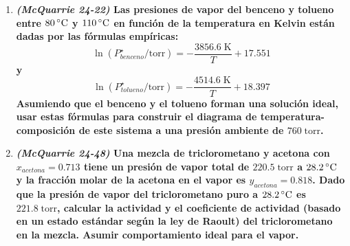 \documentclass[a4paper,12pt]{article}
\begin{document}
\begin{enumerate}
 \item \textbf{\textit{(McQuarrie 24-22)} Las presiones de vapor del benceno y tolueno entre $80\,\celsius$ y $110\,\celsius$ en funci\'on de la temperatura en Kelvin est\'an dadas por las f\'ormulas emp\'iricas:}
$$\ln(P_{benceno}^\star/\mbox{torr})=-\frac{3856.6\;\mbox{K}}{T}+17.551$$
\textbf{y}
$$\ln(P_{tolueno}^\star/\mbox{torr})=-\frac{4514.6\;\mbox{K}}{T}+18.397$$
\textbf{Asumiendo que el benceno y el tolueno forman una soluci\'on ideal, usar estas f\'ormulas para construir el diagrama de temperatura-composici\'on de este sistema a una presi\'on ambiente de $760\;\mbox{torr}$.} %



 \item \textbf{\textit{(McQuarrie 24-48)} Una mezcla de triclorometano y acetona con $x_{acetona}=0.713$ tiene un presi\'on de vapor total de $220.5\;\mbox{torr}$ a $28.2\,\celsius$ y la fracci\'on molar de la acetona en el vapor es $y_{acetona}=0.818$. Dado que la presi\'on de vapor del triclorometano puro a $28.2\,\celsius$ es $221.8\;\mbox{torr}$, calcular la actividad y el coeficiente de actividad (basado en un estado est\'andar seg\'un la ley de Raoult) del triclorometano en la mezcla. Asumir comportamiento ideal para el vapor.}  %



\end{enumerate}
 
\end{document}
